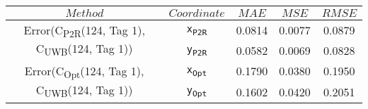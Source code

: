 \begin{table}[h]
\centering
\begin{tabular}{|c|c|c|c|c|}
\hline
$Method$ & $Coordinate$ & $MAE$ & $MSE$ & $RMSE$ \\
\hline
\multirow{2}{*}{{\footnotesize Error(C\textsubscript{P2R}(124, Tag 1), C\textsubscript{UWB}(124, Tag 1))}} & \texttt{x\textsubscript{P2R}} & 0.0814 & 0.0077 & 0.0879 \\
& \texttt{y\textsubscript{P2R}} & 0.0582 & 0.0069 & 0.0828 \\
\hline
\multirow{2}{*}{{\footnotesize Error(C\textsubscript{Opt}(124, Tag 1), C\textsubscript{UWB}(124, Tag 1))}} & \texttt{x\textsubscript{Opt}} & 0.1790 & 0.0380 & 0.1950 \\
& \texttt{y\textsubscript{Opt}} & 0.1602 & 0.0420 & 0.2051 \\
\hline
\end{tabular}
\end{table}
